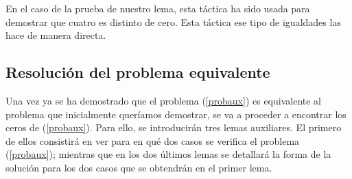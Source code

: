 En el caso de la prueba de nuestro lema, esta táctica ha sido
usada para demostrar que cuatro es distinto de cero. Esta táctica
ese tipo de igualdades las hace de manera directa.

\subsection{Resolución del problema equivalente}
Una vez ya se ha demostrado que el problema (\ref{probaux}) es
equivalente al problema que inicialmente queríamos demostrar, se
va a proceder a encontrar los ceros de (\ref{probaux}). Para
ello, se introducirán tres lemas auxiliares. El primero de ellos
consistirá en ver para en qué dos casos se verifica el problema
(\ref{probaux}); mientras que en los dos últimos lemas se detallará
la forma de la solución para los dos casos que se obtendrán en el
primer lema.

